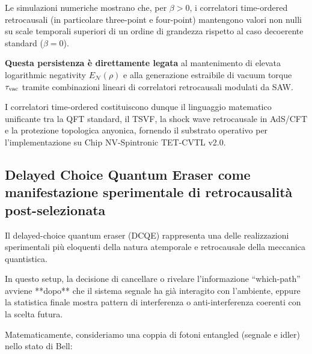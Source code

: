 \documentclass[11pt,a4paper]{article}
\theoremstyle{plain}
\theoremstyle{definition}
\begin{document}
Le simulazioni numeriche mostrano che, per $\beta > 0$, i correlatori time-ordered retrocausali (in particolare three-point e four-point) mantengono valori non nulli su scale temporali superiori di un ordine di grandezza rispetto al caso decoerente standard ($\beta=0$). 


\vspace{0.5cm}



\textbf{Questa persistenza è direttamente legata} al mantenimento di elevata logarithmic negativity $E_{\mathcal{N}}(\rho)$ e alla generazione estraibile di vacuum torque $\tau_{\rm vac}$ tramite combinazioni lineari di correlatori retrocausali modulati da SAW.

\vspace{0.5cm}

I correlatori time-ordered costituiscono dunque il linguaggio matematico unificante tra la QFT standard, il TSVF, la shock wave retrocausale in AdS/CFT e la protezione topologica anyonica, fornendo il substrato operativo per l'implementazione su Chip NV-Spintronic TET-CVTL v2.0.








\subsection{Delayed Choice Quantum Eraser come manifestazione sperimentale di retrocausalità post-selezionata}

\vspace{0.2cm}


Il delayed-choice quantum eraser (DCQE) rappresenta una delle realizzazioni sperimentali più eloquenti della natura atemporale e retrocausale della meccanica quantistica. 


\vspace{0.3cm}



In questo setup, la decisione di cancellare o rivelare l'informazione ``which-path'' avviene **dopo** che il sistema segnale ha già interagito con l'ambiente, eppure la statistica finale mostra pattern di interferenza o anti-interferenza coerenti con la scelta futura.

\vspace{0.3cm}

Matematicamente, consideriamo una coppia di fotoni entangled (segnale e idler) nello stato di Bell:
\end{document}
